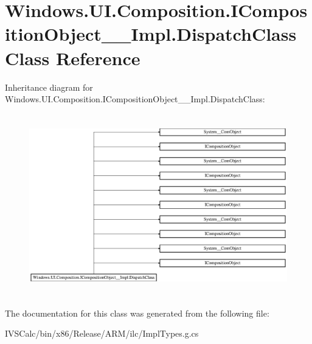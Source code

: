 \hypertarget{class_windows_1_1_u_i_1_1_composition_1_1_i_composition_object_____impl_1_1_dispatch_class}{}\section{Windows.\+U\+I.\+Composition.\+I\+Composition\+Object\+\_\+\+\_\+\+Impl.\+Dispatch\+Class Class Reference}
\label{class_windows_1_1_u_i_1_1_composition_1_1_i_composition_object_____impl_1_1_dispatch_class}
Inheritance diagram for Windows.\+U\+I.\+Composition.\+I\+Composition\+Object\+\_\+\+\_\+\+Impl.\+Dispatch\+Class\+:\begin{figure}[H]
\begin{center}
\leavevmode
\includegraphics[height=7.917737cm]{class_windows_1_1_u_i_1_1_composition_1_1_i_composition_object_____impl_1_1_dispatch_class}
\end{center}
\end{figure}


The documentation for this class was generated from the following file\+:\begin{DoxyCompactItemize}
\item 
I\+V\+S\+Calc/bin/x86/\+Release/\+A\+R\+M/ilc/Impl\+Types.\+g.\+cs\end{DoxyCompactItemize}
